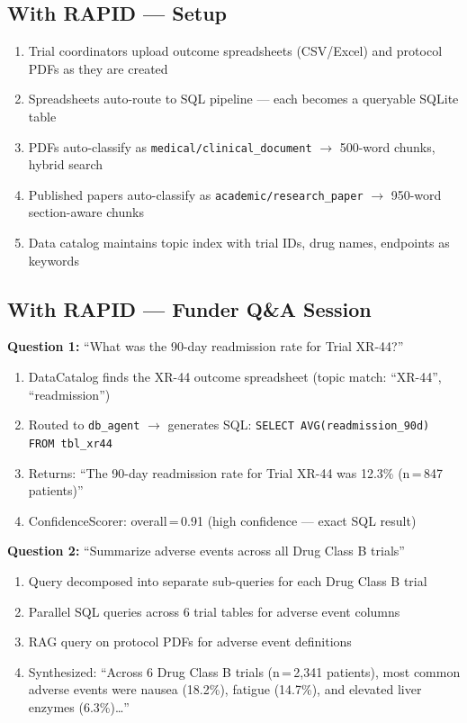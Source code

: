 \documentclass[12pt, a4paper, oneside]{report}
\newcommand{\kw}[1]{\texttt{\small #1}}
\begin{document}
\subsection*{With RAPID — Setup}
\begin{enumerate}
  \item Trial coordinators upload outcome spreadsheets (CSV/Excel) and protocol PDFs as they are created
  \item Spreadsheets auto-route to SQL pipeline — each becomes a queryable SQLite table
  \item PDFs auto-classify as \kw{medical/clinical\_document} $\to$ 500-word chunks, hybrid search
  \item Published papers auto-classify as \kw{academic/research\_paper} $\to$ 950-word section-aware chunks
  \item Data catalog maintains topic index with trial IDs, drug names, endpoints as keywords
\end{enumerate}

\subsection*{With RAPID — Funder Q\&A Session}

\textbf{Question 1:} ``What was the 90-day readmission rate for Trial XR-44?''
\begin{enumerate}
  \item DataCatalog finds the XR-44 outcome spreadsheet (topic match: ``XR-44'', ``readmission'')
  \item Routed to \kw{db\_agent} $\to$ generates SQL: \kw{SELECT AVG(readmission\_90d) FROM tbl\_xr44}
  \item Returns: ``The 90-day readmission rate for Trial XR-44 was 12.3\% (n\,=\,847 patients)''
  \item ConfidenceScorer: overall\,=\,0.91 (high confidence — exact SQL result)
\end{enumerate}

\textbf{Question 2:} ``Summarize adverse events across all Drug Class B trials''
\begin{enumerate}
  \item Query decomposed into separate sub-queries for each Drug Class B trial
  \item Parallel SQL queries across 6 trial tables for adverse event columns
  \item RAG query on protocol PDFs for adverse event definitions
  \item Synthesized: ``Across 6 Drug Class B trials (n\,=\,2,341 patients), most common adverse
        events were nausea (18.2\%), fatigue (14.7\%), and elevated liver enzymes (6.3\%)\ldots''
\end{enumerate}
\end{document}

